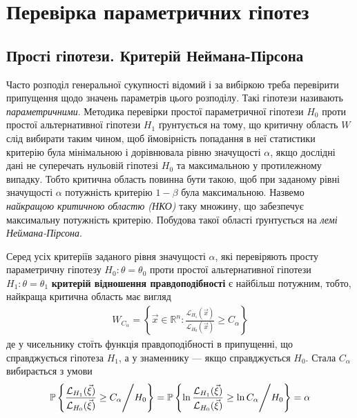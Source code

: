 \section{Перевірка параметричних гіпотез}
\subsection{Прості гіпотези. Критерій Неймана-Пірсона}

Часто розподіл генеральної сукупності відомий і за вибіркою треба перевірити 
припущення щодо значень параметрів цього розподілу. Такі гіпотези називають 
\emph{параметричними}. Методика перевірки простої параметричної гіпотези $H_0$
проти простої альтернативної гіпотези $H_1$ ґрунтується на тому, що критичну область $W$
слід вибирати таким чином, щоб ймовірність попадання в неї статистики критерію була мінімальною і 
дорівнювала рівню значущості $\alpha$, якщо дослідні дані не суперечать нульовій гіпотезі $H_0$ та 
максимальною у протилежному випадку. 
Тобто критична область повинна бути такою, щоб при заданому рівні значущості $\alpha$ потужність критерію
$1-\beta$ була максимальною. Назвемо \emph{найкращою критичною областю (НКО)} таку множину, що забезпечує максимальну 
потужність критерію. Побудова такої області ґрунтується на \emph{лемі Неймана-Пірсона}.
\begin{theorem*}
    Серед усіх критеріїв заданого рівня значущості $\alpha$, які 
    перевіряють просту параметричну гіпотезу $H_0 : \theta = \theta_0$ проти простої альтернативної гіпотези 
    $H_1: \theta = \theta_1$ \textbf{критерій відношення правдоподібності} є найбільш потужним, тобто, найкраща критична область
    має вигляд
    \begin{gather}
        W_{C_\alpha} = \left\{
            \vec{x} \in \mathbb{R}^n : \frac{\mathcal{L}_{H_1}(\vec{x})}{\mathcal{L}_{H_0}(\vec{x})} \geq C_{\alpha}
         \right\}
    \end{gather}
    де у чисельнику стоїть функція правдоподібності в припущенні, що справджується 
    гіпотеза $H_1$, а у знаменнику --- якщо справджується $H_0$. Стала $C_{\alpha}$ вибирається з умови
    \begin{gather}
        \P \left\{ \frac{\mathcal{L}_{H_1}(\vec{\xi})}{\mathcal{L}_{H_0}(\vec{\xi})} \geq C_{\alpha} \middle/ H_0\right\} = 
        \P \left\{ \ln\frac{\mathcal{L}_{H_1}(\vec{\xi})}{\mathcal{L}_{H_0}(\vec{\xi})} \geq \ln C_{\alpha} \middle/ H_0\right\} = \alpha
    \end{gather}
\end{theorem*}
